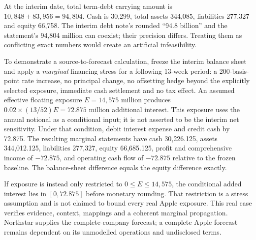 At the interim date, total term-debt carrying amount is
$10{,}848+83{,}956=94{,}804$. Cash is 30,299, total assets 344,085,
liabilities 277,327 and equity 66,758. The interim debt note's rounded
``94.8 billion'' and the statement's 94,804 million can coexist; their
precision differs. Treating them as conflicting exact numbers would create
an artificial infeasibility.

To demonstrate a source-to-forecast calculation, freeze the interim balance
sheet and apply a \emph{marginal} financing stress for a following 13-week
period: a 200-basis-point rate increase, no principal change, no offsetting
hedge beyond the explicitly selected exposure, immediate cash settlement and
no tax effect. An assumed effective floating exposure $E=14{,}575$ million
produces $0.02\times(13/52)E=72.875$ million additional interest. This exposure
uses the annual notional as a conditional input; it is not asserted to be the
interim net sensitivity. Under that condition, debit interest expense and
credit cash by 72.875. The resulting marginal statements have cash 30,226.125,
assets 344,012.125, liabilities 277,327, equity 66,685.125, profit and comprehensive
income of $-72.875$, and operating cash flow of $-72.875$ relative to the frozen
baseline. The balance-sheet difference equals the equity difference exactly.

If exposure is instead only restricted to $0\leq E\leq14{,}575$, the
conditional added interest lies in $[0,72.875]$ before monetary rounding. That
restriction is a stress assumption and is not claimed to bound every real
Apple exposure. This real case verifies evidence, context, mappings and a
coherent marginal propagation. Northstar supplies the complete-company
forecast; a complete Apple forecast remains dependent on its unmodelled
operations and undisclosed terms.
